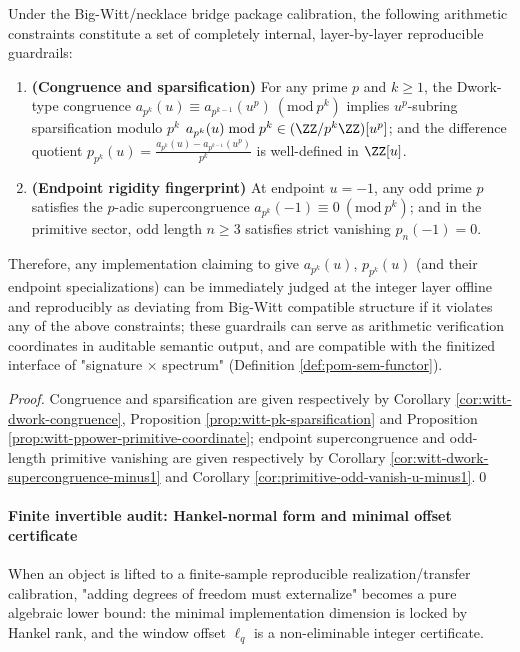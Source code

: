 \begin{proposition}\label{prop:dephys-padic-guardrails-endpoint-rigidity}
Under the Big-Witt/necklace bridge package calibration, the following arithmetic constraints constitute a set of completely internal, layer-by-layer reproducible guardrails:
\begin{enumerate}
  \item \textbf{(Congruence and sparsification)}
  For any prime \(p\) and \(k\ge 1\), the Dwork-type congruence
  \(
  a_{p^k}(u)\equiv a_{p^{k-1}}(u^p)\ (\mathrm{mod}\ p^k)
  \)
  implies \(u^p\)-subring sparsification modulo \(p^k\)
  \(
  a_{p^k}(u)\bmod p^k\in(\ZZ/p^k\ZZ)[u^p]
  \);
  and the difference quotient
  \(
  p_{p^k}(u)=\frac{a_{p^k}(u)-a_{p^{k-1}}(u^p)}{p^k}
  \)
  is well-defined in \(\ZZ[u]\).
  \item \textbf{(Endpoint rigidity fingerprint)}
  At endpoint \(u=-1\), any odd prime \(p\) satisfies the \(p\)-adic supercongruence
  \(
  a_{p^k}(-1)\equiv 0\ (\mathrm{mod}\ p^k)
  \);
  and in the primitive sector, odd length \(n\ge 3\) satisfies strict vanishing \(p_n(-1)=0\).
\end{enumerate}
Therefore, any implementation claiming to give \(a_{p^k}(u)\), \(p_{p^k}(u)\) (and their endpoint specializations) can be immediately judged at the integer layer offline and reproducibly as deviating from Big-Witt compatible structure if it violates any of the above constraints;
these guardrails can serve as arithmetic verification coordinates in auditable semantic output, and are compatible with the finitized interface of "signature \(\times\) spectrum" (Definition \ref{def:pom-sem-functor}).
\end{proposition}

\begin{proof}
Congruence and sparsification are given respectively by Corollary \ref{cor:witt-dwork-congruence}, Proposition \ref{prop:witt-pk-sparsification} and Proposition \ref{prop:witt-ppower-primitive-coordinate};
endpoint supercongruence and odd-length primitive vanishing are given respectively by Corollary \ref{cor:witt-dwork-supercongruence-minus1} and Corollary \ref{cor:primitive-odd-vanish-u-minus1}.\qed
\end{proof}

\paragraph{Finite invertible audit: Hankel-normal form and minimal offset certificate}
When an object is lifted to a finite-sample reproducible realization/transfer calibration, "adding degrees of freedom must externalize" becomes a pure algebraic lower bound: the minimal implementation dimension is locked by Hankel rank, and the window offset \(\ell_q\) is a non-eliminable integer certificate.

